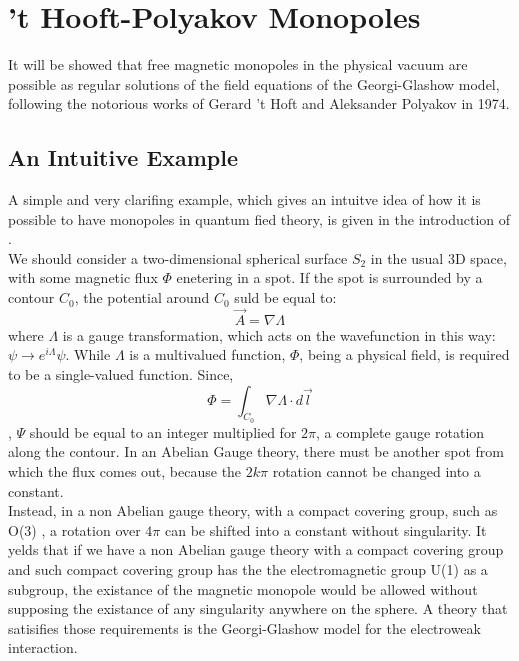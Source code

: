 \section{’t Hooft-Polyakov Monopoles}
It will be showed that free magnetic monopoles in the physical vacuum are possible as regular solutions of the field equations of the Georgi-Glashow model, following the notorious works of Gerard 't Hoft \cite{Hof:Mon} and Aleksander Polyakov \cite{Pol:Mon} in 1974. 
\subsection{An Intuitive Example}
A simple and very clarifing example, which gives an intuitve idea of how it is possible to have monopoles in quantum fied theory, is given in the introduction of \cite{Hof:Mon}. \\
We should consider a two-dimensional spherical surface $S_2$ in the usual 3D space, with some magnetic flux $\Phi$ enetering in a spot. If the spot is surrounded by a contour $C_0$, the potential around $C_0$ suld be equal to: 
\begin{equation}
    \Vec{A}= \nabla \Lambda 
\end{equation}
where $\Lambda$ is a gauge transformation, which acts on the wavefunction in this way: $\psi \rightarrow e^{i\Lambda} \psi $. 
While $\Lambda$ is a multivalued function, $\Phi$, being a physical field, is required to be a single-valued function. Since, 
\begin{equation}
    \Phi = \int_{C_0} \nabla \Lambda \cdot d\Vec{l}
\end{equation}, 
$\Psi$ should be equal to an integer multiplied for $2 \pi  $, a complete gauge rotation along the contour. 
In an Abelian Gauge theory, there must be another spot from which the flux comes out, because the $2k \pi$ rotation cannot be changed into a constant. \\ 
Instead, in a non Abelian gauge theory, with a compact covering group, such as O(3) , a rotation over $4\pi$ can be shifted into a constant without singularity.
It yelds that if we have a non Abelian gauge theory with a compact covering group and such compact covering group has the the electromagnetic group  U(1) as a subgroup, the existance of the magnetic monopole would be allowed without supposing the existance of any singularity anywhere on the sphere.
A theory that satisifies those requirements is the Georgi-Glashow model for the electroweak interaction.

